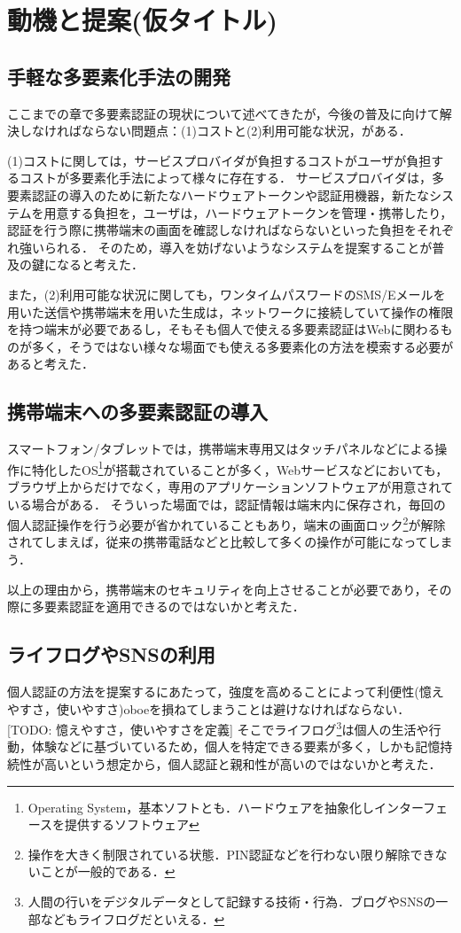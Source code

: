 \chapter{動機と提案(仮タイトル)}\label{chap:motive}
\section{手軽な多要素化手法の開発}
ここまでの章で多要素認証の現状について述べてきたが，今後の普及に向けて解決しなければならない問題点：(1)コストと(2)利用可能な状況，がある．

(1)コストに関しては，サービスプロバイダが負担するコストがユーザが負担するコストが多要素化手法によって様々に存在する．
サービスプロバイダは，多要素認証の導入のために新たなハードウェアトークンや認証用機器，新たなシステムを用意する負担を，ユーザは，ハードウェアトークンを管理・携帯したり，認証を行う際に携帯端末の画面を確認しなければならないといった負担をそれぞれ強いられる．
そのため，導入を妨げないようなシステムを提案することが普及の鍵になると考えた．

また，(2)利用可能な状況に関しても，ワンタイムパスワードのSMS/Eメールを用いた送信や携帯端末を用いた生成は，ネットワークに接続していて操作の権限を持つ端末が必要であるし，そもそも個人で使える多要素認証はWebに関わるものが多く，そうではない様々な場面でも使える多要素化の方法を模索する必要があると考えた．

\section{携帯端末への多要素認証の導入}
スマートフォン/タブレットでは，携帯端末専用又はタッチパネルなどによる操作に特化したOS\footnote{Operating System，基本ソフトとも．ハードウェアを抽象化しインターフェースを提供するソフトウェア}が搭載されていることが多く，Webサービスなどにおいても，ブラウザ上からだけでなく，専用のアプリケーションソフトウェアが用意されている場合がある．
そういった場面では，認証情報は端末内に保存され，毎回の個人認証操作を行う必要が省かれていることもあり，端末の画面ロック\footnote{操作を大きく制限されている状態．PIN認証などを行わない限り解除できないことが一般的である．}が解除されてしまえば，従来の携帯電話などと比較して多くの操作が可能になってしまう．

以上の理由から，携帯端末のセキュリティを向上させることが必要であり，その際に多要素認証を適用できるのではないかと考えた．

\section{ライフログやSNSの利用}
個人認証の方法を提案するにあたって，強度を高めることによって利便性(憶えやすさ，使いやすさ)oboeを損ねてしまうことは避けなければならない．
[TODO: 憶えやすさ，使いやすさを定義]
そこでライフログ\footnote{人間の行いをデジタルデータとして記録する技術・行為．ブログやSNSの一部などもライフログだといえる．}は個人の生活や行動，体験などに基づいているため，個人を特定できる要素が多く，しかも記憶持続性が高いという想定から，個人認証と親和性が高いのではないかと考えた．

